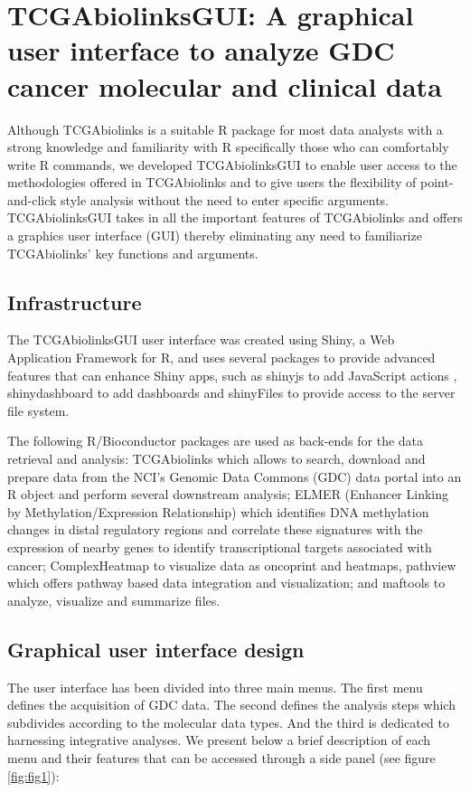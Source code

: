 \newpage
\section{TCGAbiolinksGUI: A graphical user interface to analyze GDC cancer molecular and clinical data}

Although TCGAbiolinks is a suitable R package for most data analysts with a strong knowledge and familiarity with R specifically those who can comfortably write R commands, we developed TCGAbiolinksGUI to enable user access to the methodologies offered in TCGAbiolinks and to give users the flexibility of point-and-click style analysis without the need to enter specific arguments. TCGAbiolinksGUI takes in all the important features of TCGAbiolinks and offers a graphics user interface (GUI) thereby eliminating any need to familiarize TCGAbiolinks' key functions and arguments.

\subsection{Infrastructure}
The TCGAbiolinksGUI user interface was created using Shiny, a Web Application Framework for R, and uses several packages to provide advanced features that can enhance Shiny apps, such as shinyjs to add JavaScript actions \cite{shinyjs}, shinydashboard to add dashboards \cite{shinydashboard} and shinyFiles \cite{shinyFiles} to provide access to the server file system.

The following R/Bioconductor packages are used as back-ends for the data retrieval and analysis: TCGAbiolinks \cite{TCGAbiolinks} which allows to search, download and prepare data from the NCI's Genomic Data Commons (GDC) data portal into an R object and perform several downstream analysis;  ELMER (Enhancer Linking by Methylation/Expression Relationship) \cite{yao2015inferring, ELMER2} which identifies DNA methylation changes in distal regulatory regions and correlate these signatures with the expression of nearby genes to identify transcriptional targets associated with cancer; ComplexHeatmap \cite{Gu20052016} to visualize data as oncoprint and heatmaps, pathview \cite{luo2013pathview} which offers pathway based data integration and visualization; and maftools \cite{Maftools} to analyze, visualize and summarize  files.


\subsection{Graphical user interface design}
The user interface has been divided into three main  menus. The first menu defines the acquisition of GDC data. The second defines the analysis steps which subdivides according to the molecular data types.  And the third is dedicated to harnessing integrative analyses. We present below a brief description of each menu and their features that can be accessed through a side panel (see figure \ref{fig:fig1}):

